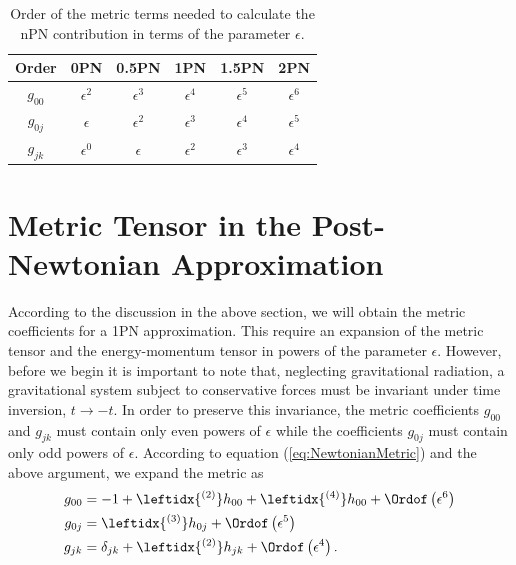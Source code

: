\begin{table}[h]
\begin{center}
\begin{tabular}{|c|c|c|c|c|c|}
\hline
Order & 0PN & 0.5PN & 1PN & 1.5PN & 2PN \\
\hline
$g_{00}$ & $\epsilon^2$ & $\epsilon^3$ &  $\epsilon^4$& $\epsilon^5$ & $\epsilon^6$ \\
$g_{0j}$ & $\epsilon$  & $\epsilon^2$ & $\epsilon^3$ & $\epsilon^4$  & $\epsilon^5$  \\ 
$g_{jk}$ & $\epsilon^0$ & $\epsilon$  & $\epsilon^2$ & $\epsilon^3$ & $\epsilon^4$ \\
\hline
\end{tabular}
\caption{ Order of the metric terms needed to calculate the nPN contribution in terms of the parameter $\epsilon$.}
\label{tab:nPNOrder}
\end{center}
\end{table}

\section{Metric Tensor in the Post-Newtonian Approximation}
According to the discussion in the above section, we will obtain the metric coefficients for a 1PN approximation. This require an expansion of the metric tensor and the energy-momentum tensor in powers of the parameter $\epsilon$. However, before we begin it is important to note that, neglecting gravitational radiation, a gravitational system subject to conservative forces must be invariant under time inversion, $t \rightarrow -t$. In order to preserve this invariance,  the metric coefficients $g_{00}$ and $g_{jk}$ must contain only even powers of $\epsilon$ while the coefficients $g_{0j}$ must contain only odd powers of $\epsilon$. According to equation (\ref{eq:NewtonianMetric}) and the above argument, we expand the metric as
\begin{subequations}\label{eq:PNMetricInitial}
\begin{align}
g_{00} &= -1 + \leftidx{^{(2)}}h_{00} + \leftidx{^{(4)}}h_{00} + \Ordof \left( \epsilon^6 \right) \\
g_{0j} &= \leftidx{^{(3)}}h_{0j} +  \Ordof \left( \epsilon^5 \right)  \\
g_{jk} &= \delta_{jk} + \leftidx{^{(2)}}h_{jk} + \Ordof \left( \epsilon^4 \right) .
\end{align}
\end{subequations}

